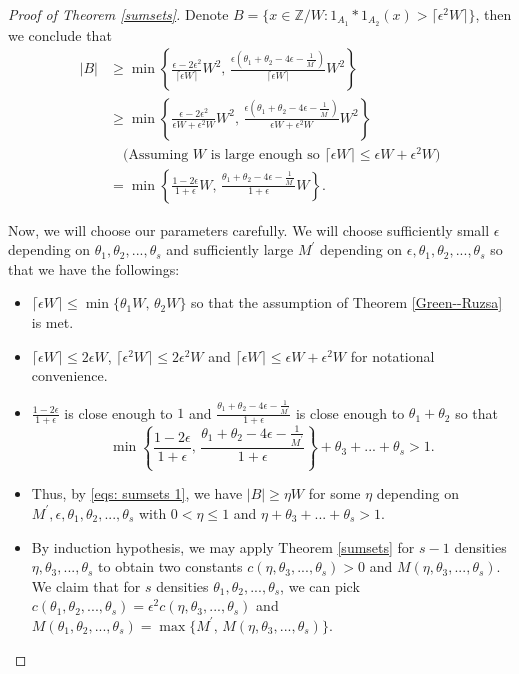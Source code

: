 \documentclass[11pt]{amsart}
\theoremstyle{plain} %
\theoremstyle{remark}
\numberwithin{equation}{section}
\newcommand{\Z}{\mathbb{Z}}
\begin{document}
\begin{proof}[Proof of Theorem \ref{sumsets}]
    Denote $B=\{x\in\Z/W:1_{A_1}*1_{A_2}(x)>\lceil \epsilon^2 W\rceil\}$, then we conclude that
    \begin{equation}\label{eqs: sumsets 1}
        \begin{split}
            |B|&\geq \min\left\{\frac{\epsilon-2\epsilon^2}{\lceil \epsilon W\rceil}W^2,\,\frac{\epsilon\left(\theta_1+\theta_2-4\epsilon-\frac{1}{M^{\prime}}\right)}{\lceil \epsilon W\rceil}W^2\right\}\\
            &\geq \min\left\{\frac{\epsilon-2\epsilon^2}{\epsilon W+\epsilon^2 W}W^2,\,\frac{\epsilon\left(\theta_1+\theta_2-4\epsilon-\frac{1}{M^{\prime}}\right)}{\epsilon W+\epsilon^2 W}W^2\right\}\\
            &\quad\text{(Assuming $W$ is large enough so $\lceil\epsilon W\rceil\leq \epsilon W+\epsilon^2W$)}\\
            &=\min\left\{\frac{1-2\epsilon}{1+\epsilon}W,\,\frac{\theta_1+\theta_2-4\epsilon-\frac{1}{M^{\prime}}}{1+\epsilon}W\right\}.
        \end{split}
    \end{equation}

    Now, we will choose our parameters carefully. We will choose sufficiently small $\epsilon$ depending on $\theta_1,\theta_2,...,\theta_s$ and sufficiently large $M^{\prime}$ depending on $\epsilon,\theta_1,\theta_2,...,\theta_s$ so that we have the followings:
    \begin{itemize}
        \item $\lceil \epsilon W\rceil\leq \min\{\theta_1 W,\,\theta_2 W\}$ so that the assumption of Theorem \ref{Green--Ruzsa} is met.
        \item $\lceil \epsilon W\rceil\leq 2\epsilon W$, $\lceil \epsilon^2 W\rceil\leq 2\epsilon^2 W$ and $\lceil\epsilon W\rceil\leq \epsilon W+\epsilon^2W$ for notational convenience.
        \item $\frac{1-2\epsilon}{1+\epsilon}$ is close enough to $1$ and $\frac{\theta_1+\theta_2-4\epsilon-\frac{1}{M^{\prime}}}{1+\epsilon}$ is close enough to $\theta_1+\theta_2$ so that 
        \begin{equation*}
            \min\left\{\frac{1-2\epsilon}{1+\epsilon},\,\frac{\theta_1+\theta_2-4\epsilon-\frac{1}{M^{\prime}}}{1+\epsilon}\right\}+\theta_3+...+\theta_s>1.
        \end{equation*}
        \item Thus, by \eqref{eqs: sumsets 1}, we have $|B|\geq \eta W$ for some $\eta$ depending on $M^{\prime},\epsilon,\theta_1,\theta_2,...,\theta_s$ with $0<\eta\leq 1$ and $\eta+\theta_3+...+\theta_s>1$.
        \item By induction hypothesis, we may apply Theorem \ref{sumsets} for $s-1$ densities $\eta,\theta_3,...,\theta_s$ to obtain two constants $c(\eta,\theta_3,...,\theta_s)>0$ and $M(\eta,\theta_3,...,\theta_s)$. We claim that for $s$ densities $\theta_1,\theta_2,...,\theta_s$, we can pick $c(\theta_1,\theta_2,...,\theta_s)=\epsilon^2 c(\eta,\theta_3,...,\theta_s)$ and $M(\theta_1,\theta_2,...,\theta_s)=\max\{M^{\prime},\,M(\eta,\theta_3,...,\theta_s)\}$.
    \end{itemize}


\end{proof}
\end{document}
